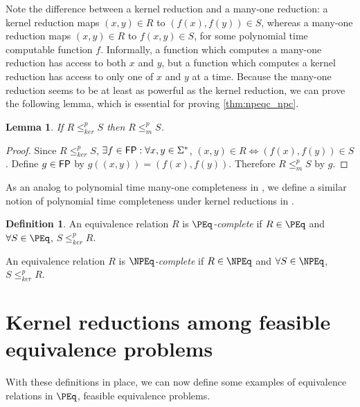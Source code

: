 \documentclass{amsart}
\newtheorem{lemma}[lemma]{Lemma}
\theoremstyle{definition} \newtheorem{definition}[definition]{Definition}
\newcommand{\sigmastar}{\Sigma^{*}} %
\newcommand{\kr}{\leq^{p}_{ker}} %
\newcommand{\mor}{\leq^{p}_{m}} %
\newcommand{\defn}[1]{\emph{#1}} %
\begin{document}
Note the difference between a kernel reduction and a many-one reduction: a
kernel reduction maps $(x,y)\in R$ to $(f(x), f(y))\in S$, whereas a many-one
reduction maps $(x,y)\in R$ to $f(x, y)\in S$, for some polynomial time
computable function $f$. Informally, a function which computes a many-one
reduction has access to both $x$ and $y$, but a function which computes a
kernel reduction has access to only one of $x$ and $y$ at a time. Because the
many-one reduction seems to be at least as powerful as the kernel reduction, we
can prove the following lemma, which is essential for proving
\autoref{thm:npeqc_npc}.

\begin{lemma}\label{lem:kr_mor}If $R\kr S$ then $R\mor S$.\end{lemma}
\begin{proof}
  Since $R\kr S$, $\exists f\in\FP:\forall x,y\in\sigmastar$, $(x,y)\in
  R\iff(f(x), f(y))\in S$. Define $g\in{\ensuremath{\mathsf{FP}}}$ by $g((x,y))=(f(x),
  f(y))$. Therefore $R\mor S$ by $g$.
\end{proof}

As an analog to polynomial time many-one completeness in \NP, we define a
similar notion of polynomial time completeness under kernel reductions in
\NPEq.

\begin{definition}\label{def:kernel_complete}
  An equivalence relation $R$ is \defn{$\PEq$-complete} if $R\in\PEq$ and
  $\forall S\in\PEq$, $S\kr R$.

  An equivalence relation $R$ is \defn{$\NPEq$-complete} if $R\in\NPEq$ and
  $\forall S\in\NPEq$, $S\kr R$.
\end{definition}

\section{Kernel reductions among feasible equivalence problems}

With these definitions in place, we can now define some examples of equivalence
relations in $\PEq$, feasible equivalence problems.
\end{document}

